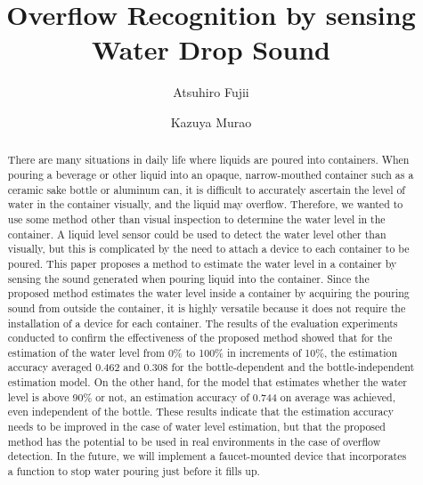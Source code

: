 \documentclass[sigconf]{acmart}
\begin{document}
\title{Overflow Recognition by sensing Water Drop Sound}

\author{Atsuhiro Fujii}

\author{Kazuya Murao}

\renewcommand{\shortauthors}{Fujii and Murao}

\begin{abstract}
  There are many situations in daily life where liquids are poured into containers. When pouring a beverage or other liquid into an opaque, narrow-mouthed container such as a ceramic sake bottle or aluminum can, it is difficult to accurately ascertain the level of water in the container visually, and the liquid may overflow. Therefore, we wanted to use some method other than visual inspection to determine the water level in the container. A liquid level sensor could be used to detect the water level other than visually, but this is complicated by the need to attach a device to each container to be poured. This paper proposes a method to estimate the water level in a container by sensing the sound generated when pouring liquid into the container. Since the proposed method estimates the water level inside a container by acquiring the pouring sound from outside the container, it is highly versatile because it does not require the installation of a device for each container. The results of the evaluation experiments conducted to confirm the effectiveness of the proposed method showed that for the estimation of the water level from 0\% to 100\% in increments of 10\%, the estimation accuracy averaged 0.462 and 0.308 for the bottle-dependent and the bottle-independent estimation model. On the other hand, for the model that estimates whether the water level is above 90\% or not, an estimation accuracy of 0.744 on average was achieved, even independent of the bottle. These results indicate that the estimation accuracy needs to be improved in the case of water level estimation, but that the proposed method has the potential to be used in real environments in the case of overflow detection. In the future, we will implement a faucet-mounted device that incorporates a function to stop water pouring just before it fills up.
\end{abstract}
\end{document}
